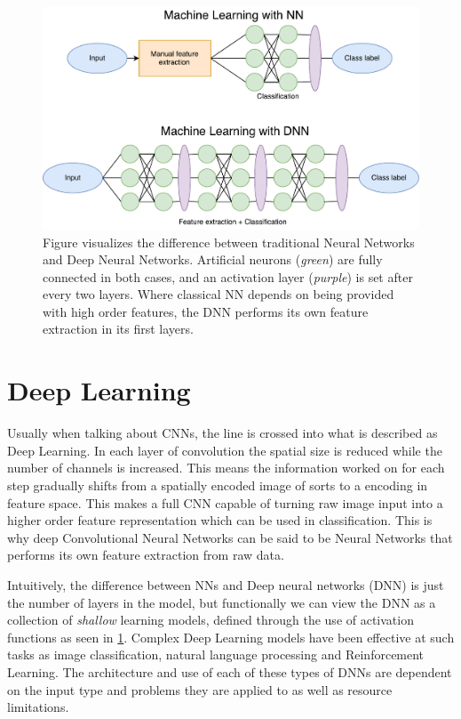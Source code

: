 \begin{figure}[h] 
    \centering
    \includegraphics[width=0.8\linewidth]{Chapters/Background/figures/NNvsDNN.pdf}
    \caption{Figure visualizes the difference between traditional Neural Networks and Deep Neural Networks. Artificial neurons (\textit{green}) are fully connected in both cases, and an activation layer (\textit{purple}) is set after every two layers. Where classical NN depends on being provided with high order features, the DNN performs its own feature extraction in its first layers.}
    \label{fig:NNvsDNN}
\end{figure}

\section{Deep Learning}
Usually when talking about CNNs, the line is crossed into what is described as Deep Learning. In each layer of convolution the spatial size is reduced while the number of channels is increased. This means the information worked on for each step gradually shifts from a spatially encoded image of sorts to a encoding in feature space. This makes a full CNN capable of turning raw image input into a higher order feature representation which can be used in classification. This is why deep Convolutional Neural Networks can be said to be Neural Networks that performs its own feature extraction from raw data.

Intuitively, the difference between NNs and Deep neural networks (DNN) is just the number of layers in the model, but functionally we can view the DNN as a collection of \textit{shallow} learning models, defined through the use of activation functions as seen in \ref{fig:NNvsDNN}. Complex Deep Learning models have been effective at such tasks as image classification\cite{imageclassification}, natural language processing\cite{deepnlp} and Reinforcement Learning\cite{deepreinforcementlearning}. The architecture and use of each of these types of DNNs are dependent on the input type and problems they are applied to as well as resource limitations.

